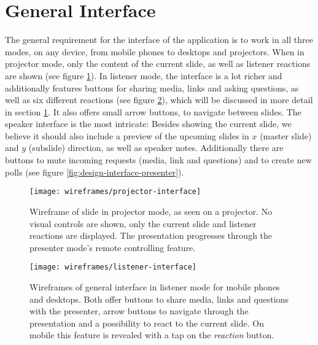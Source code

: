 

\section{General Interface}
The general requirement for the interface of the application is to work in all three modes, on any device, from mobile phones to desktops and projectors. When in projector mode, only the content of the current slide, as well as listener reactions are shown (see figure \ref{fig:design-interface-projector}). In listener mode, the interface is a lot richer and additionally features buttons for sharing media, links and asking questions, as well as six different reactions (see figure \ref{fig:design-interface-listener}), which will be discussed in more detail in section \ref{}. It also offers small arrow buttons, to navigate between slides. The speaker interface is the most intricate: Besides showing the current slide, we believe it should also include a preview of the upcoming slides in $x$ (master slide) and $y$ (subslide) direction, as well as speaker notes. Additionally there are buttons to mute incoming requests (media, link and questions) and to create new polls (see figure \ref{fig:design-interface-presenter}).

\begin{figure}
\centering
\texttt{[image: wireframes/projector-interface]}
\caption{Wireframe of slide in projector mode, as seen on a projector. No visual controls are shown, only the current slide and listener reactions are displayed. The presentation progresses through the presenter mode's remote controlling feature.}
\label{fig:design-interface-projector}
\end{figure}

\begin{figure}
\centering
\texttt{[image: wireframes/listener-interface]}
\caption{Wireframes of general interface in listener mode for mobile phones and desktops. Both offer buttons to share media, links and questions with the presenter, arrow buttons to navigate through the presentation and a possibility to react to the current slide. On mobile this feature is revealed with a tap on the \emph{reaction} button.}
\label{fig:design-interface-listener}
\end{figure}

